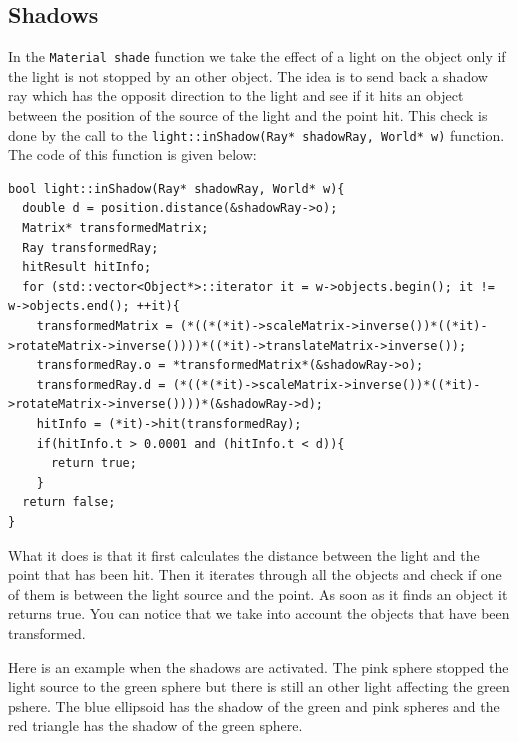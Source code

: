 \documentclass[a4paper,11.5pt]{article}
\theoremstyle{mytheor}
\begin{document}
\subsection{Shadows}
In the \texttt{Material shade} function we take the effect of a light on the object only if the light is not stopped by an other object. The idea is to send back a shadow ray which has the opposit direction to the light and see if it hits an object between the position of the source of the light and the point hit. This check is done by the call to the \texttt{light::inShadow(Ray* shadowRay, World* w)} function. The code of this function is given below:
\begin{lstlisting}
bool light::inShadow(Ray* shadowRay, World* w){
  double d = position.distance(&shadowRay->o);
  Matrix* transformedMatrix;
  Ray transformedRay;
  hitResult hitInfo;
  for (std::vector<Object*>::iterator it = w->objects.begin(); it != w->objects.end(); ++it){
    transformedMatrix = (*((*(*it)->scaleMatrix->inverse())*((*it)->rotateMatrix->inverse())))*((*it)->translateMatrix->inverse());
    transformedRay.o = *transformedMatrix*(&shadowRay->o);
    transformedRay.d = (*((*(*it)->scaleMatrix->inverse())*((*it)->rotateMatrix->inverse())))*(&shadowRay->d);
    hitInfo = (*it)->hit(transformedRay);
    if(hitInfo.t > 0.0001 and (hitInfo.t < d)){
      return true;
    }
  return false;
}
\end{lstlisting}
What it does is that it first calculates the distance between the light and the point that has been hit. Then it iterates through all the objects and check if one of them is between the light source and the point. As soon as it finds an object it returns true. You can notice that we take into account the objects that have been transformed.   

\begin{figure}[H]
\centering
{}
\end{figure} 
Here is an example when the shadows are activated. The pink sphere stopped the light source to the green sphere but there is still an other light affecting the green pshere. The blue ellipsoid has the shadow of the green and pink spheres and the red triangle has the shadow of the green sphere.
\end{document}
